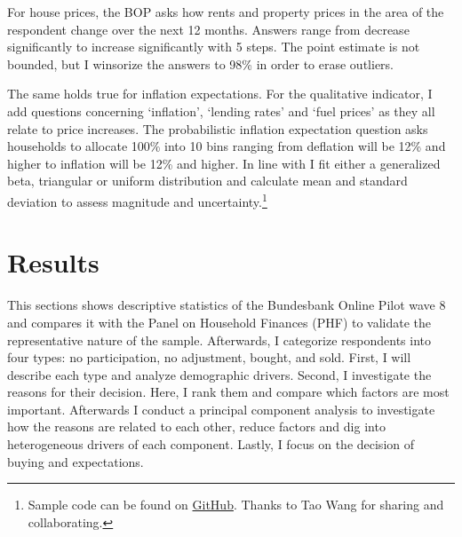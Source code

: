 \documentclass[ProjectABM]{subfiles}
\begin{document}
For house prices, the BOP asks how rents and property prices in the area of the respondent change over the next 12 months. Answers range from decrease significantly to increase significantly with 5 steps. The point estimate is not bounded, but I winsorize the answers to 98\% in order to erase outliers.

The same holds true for inflation expectations. For the qualitative indicator, I add questions concerning `inflation', `lending rates' and `fuel prices' as they all relate to price increases. The probabilistic inflation expectation question asks households to allocate 100\% into 10 bins ranging from deflation will be 12\% and higher to inflation will be 12\% and higher. In line with \cite{engelberg_manski_2009distribution} I fit either a generalized beta, triangular or uniform distribution and calculate mean and standard deviation to assess magnitude and uncertainty.\footnote{Sample code can be found on \href{https://github.com/AMonninger/DensitySurveyEstimation}{GitHub}. Thanks to Tao Wang for sharing and collaborating.}





\section{Results}\label{sec:results}
This sections shows descriptive statistics of the Bundesbank Online Pilot wave 8 and compares it with the Panel on Household Finances (PHF) to validate the representative nature of the sample. Afterwards, I categorize respondents into four types: no participation, no adjustment, bought, and sold. First, I will describe each type and analyze demographic drivers. Second, I investigate the reasons for their decision. Here, I rank them and compare which factors are most important. Afterwards I conduct a principal component analysis to investigate how the reasons are related to each other, reduce factors and dig into heterogeneous drivers of each component. Lastly, I focus on the decision of buying and expectations. 
\end{document}
